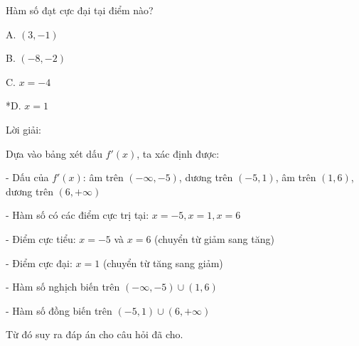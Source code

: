 \documentclass[a4paper,12pt]{article}
\begin{document}
Hàm số đạt cực đại tại điểm nào?

A. \((3,-1)\)

B. \((-8,-2)\)

C. \(x=-4\)

*D. \(x=1\)

Lời giải:


Dựa vào bảng xét dấu \(f'(x)\), ta xác định được:

- Dấu của \(f'(x)\): âm trên \((-\infty, -5)\), dương trên \((-5, 1)\), âm trên \((1, 6)\), dương trên \((6, +\infty)\)

- Hàm số có các điểm cực trị tại: \(x = -5, x = 1, x = 6\)

- Điểm cực tiểu: \(x = -5\) và \(x = 6\) (chuyển từ giảm sang tăng)

- Điểm cực đại: \(x = 1\) (chuyển từ tăng sang giảm)

- Hàm số nghịch biến trên \((-\infty, -5) \cup (1, 6)\)

- Hàm số đồng biến trên \((-5, 1) \cup (6, +\infty)\)

Từ đó suy ra đáp án cho câu hỏi đã cho.
\end{document}

